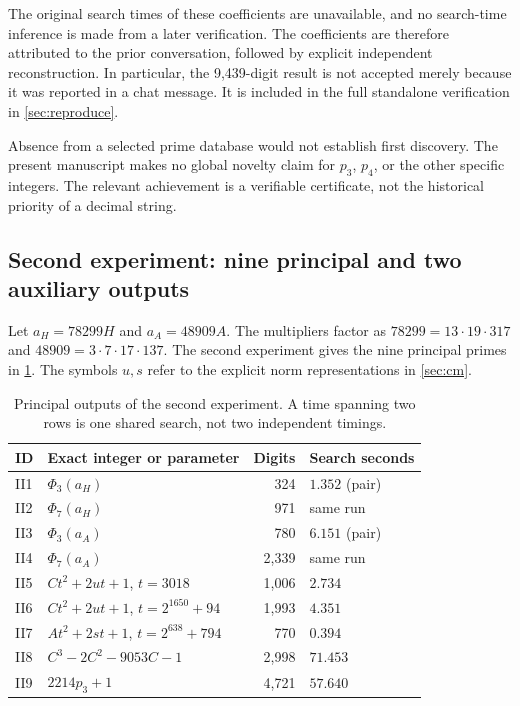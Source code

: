 \documentclass[11pt,a4paper]{article}
\theoremstyle{definition}\newtheorem{definition}[theorem]{Definition}
\theoremstyle{remark}\newtheorem{remark}[theorem]{Remark}
\begin{document}
The original search times of these coefficients are unavailable, and no
search-time inference is made from a later verification. The coefficients
are therefore attributed to the prior conversation, followed by explicit
independent reconstruction. In particular, the 9,439-digit result is not
accepted merely because it was reported in a chat message. It is included
in the full standalone verification in \cref{sec:reproduce}.

Absence from a selected prime database would not establish first discovery.
The present manuscript makes no global novelty claim for $p_3$, $p_4$, or
the other specific integers. The relevant achievement is a verifiable
certificate, not the historical priority of a decimal string.

\subsection{Second experiment: nine principal and two auxiliary outputs}
\label{sec:second}

Let $a_H=78299H$ and $a_A=48909A$. The multipliers factor as
$78299=13\cdot19\cdot317$ and $48909=3\cdot7\cdot17\cdot137$.
The second experiment gives the nine principal primes in
\cref{tab:second}. The symbols $u,s$ refer to the explicit norm
representations in \cref{sec:cm}.

\begin{table}[htbp]
\centering\small
\caption{Principal outputs of the second experiment. A time spanning two
rows is one shared search, not two independent timings.}\label{tab:second}
\begin{tabularx}{\linewidth}{@{}lXrl@{}}
\toprule
ID & Exact integer or parameter & Digits & Search seconds\\
\midrule
II1 & $\Phi_3(a_H)$ & 324 & $1.352$ (pair)\\
II2 & $\Phi_7(a_H)$ & 971 & same run\\
II3 & $\Phi_3(a_A)$ & 780 & $6.151$ (pair)\\
II4 & $\Phi_7(a_A)$ & 2,339 & same run\\
II5 & $Ct^2+2ut+1$, $t=3018$ & 1,006 & $2.734$\\
II6 & $Ct^2+2ut+1$, $t=2^{1650}+94$ & 1,993 & $4.351$\\
II7 & $At^2+2st+1$, $t=2^{638}+794$ & 770 & $0.394$\\
II8 & $C^3-2C^2-9053C-1$ & 2,998 & $71.453$\\
II9 & $2214p_3+1$ & 4,721 & $57.640$\\
\bottomrule
\end{tabularx}
\end{table}
\end{document}
